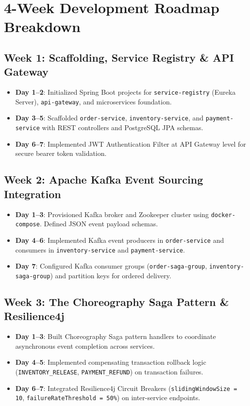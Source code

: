\documentclass[11pt,a4paper]{article}
\begin{document}
\section{4-Week Development Roadmap Breakdown}

\subsection{Week 1: Scaffolding, Service Registry \& API Gateway}
\begin{itemize}[leftmargin=*]
    \item \textbf{Day 1--2}: Initialized Spring Boot projects for \texttt{service-registry} (Eureka Server), \texttt{api-gateway}, and microservices foundation.
    \item \textbf{Day 3--5}: Scaffolded \texttt{order-service}, \texttt{inventory-service}, and \texttt{payment-service} with REST controllers and PostgreSQL JPA schemas.
    \item \textbf{Day 6--7}: Implemented JWT Authentication Filter at API Gateway level for secure bearer token validation.
\end{itemize}

\subsection{Week 2: Apache Kafka Event Sourcing Integration}
\begin{itemize}[leftmargin=*]
    \item \textbf{Day 1--3}: Provisioned Kafka broker and Zookeeper cluster using \texttt{docker-compose}. Defined JSON event payload schemas.
    \item \textbf{Day 4--6}: Implemented Kafka event producers in \texttt{order-service} and consumers in \texttt{inventory-service} and \texttt{payment-service}.
    \item \textbf{Day 7}: Configured Kafka consumer groups (\texttt{order-saga-group}, \texttt{inventory-saga-group}) and partition keys for ordered delivery.
\end{itemize}

\subsection{Week 3: The Choreography Saga Pattern \& Resilience4j}
\begin{itemize}[leftmargin=*]
    \item \textbf{Day 1--3}: Built Choreography Saga pattern handlers to coordinate asynchronous event completion across services.
    \item \textbf{Day 4--5}: Implemented compensating transaction rollback logic (\texttt{INVENTORY\_RELEASE}, \texttt{PAYMENT\_REFUND}) on transaction failures.
    \item \textbf{Day 6--7}: Integrated Resilience4j Circuit Breakers (\texttt{slidingWindowSize = 10}, \texttt{failureRateThreshold = 50\%}) on inter-service endpoints.
\end{itemize}
\end{document}
